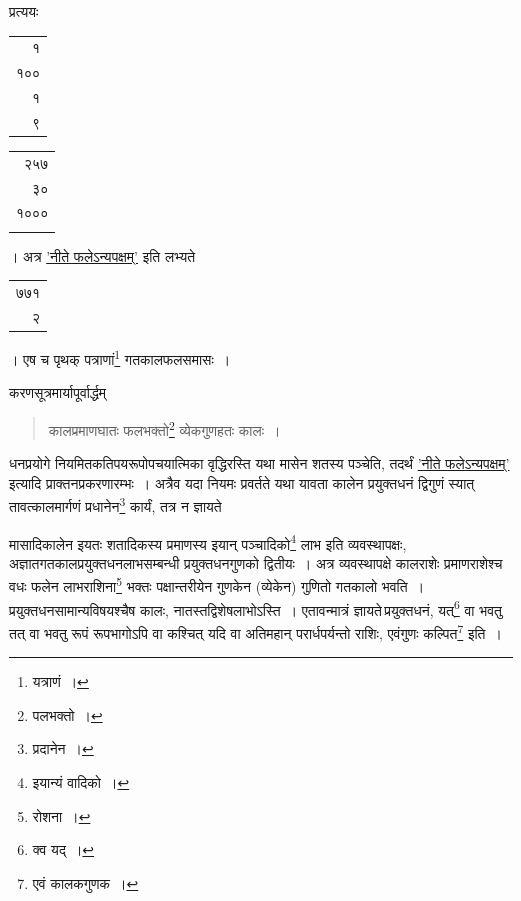 \documentclass[10pt, openany]{book}
\begin{document}
{{{{{प्रत्ययः\textendash \,\begin{tabular}{r|}१ \\१००\\१\\९\end{tabular}\begin{tabular}{r}२५७ \\ ३० \\ १००० \\ \\ \end{tabular}। अत्र \hyperref[45]{'नीते फलेऽन्यपक्षम्'} इति लभ्यते\begin{tabular}{r}७७१ \\ २\end{tabular}। एष च पृथक् पत्राणां\renewcommand{\thefootnote}{\s ५}\footnote{\s यत्राणं~।}  गतकालफलसमासः~।}
\vspace{3mm}

{करणसूत्रमार्यापूर्वार्द्धम्\textemdash}

 \label{52.1}
\begin{quote} {\bs कालप्रमाणघातः फलभक्तो\renewcommand{\thefootnote}{\s ६}\footnote{\s पलभक्तो~।}  व्येकगुणहतः कालः~।}\end{quote}

{धनप्रयोगे नियमितकतिपयरूपोपचयात्मिका वृद्धिरस्ति यथा मासेन शतस्य
पञ्चेति,}
{तदर्थं \hyperref[45]{'नीते फलेऽन्यपक्षम्'} इत्यादि प्राक्तनप्रकरणारम्भः~। अत्रैव यदा
नियमः प्रवर्तते यथा}
{यावता कालेन प्रयुक्तधनं द्विगुणं स्यात् तावत्कालमार्गणं प्रधानेन\renewcommand{\thefootnote}{\s ७}\footnote{\s प्रदानेन~।} 
कार्यं, तत्र न ज्ञायते}

\newpage

{मासादिकालेन इयतः शतादिकस्य प्रमाणस्य इयान् पञ्चादिको\renewcommand{\thefootnote}{\s २}\footnote{\s इयान्यं वादिको~।}  लाभ इति
व्यवस्थापक्षः,}
{अज्ञातगतकालप्रयुक्तधनलाभसम्बन्धी प्रयुक्तधनगुणको द्वितीयः~। अत्र
व्यवस्थापक्षे कालराशेः}
{प्रमाणराशेश्च वधः फलेन लाभराशिना\renewcommand{\thefootnote}{\s ३}\footnote{\s रोशना~।}  भक्तः पक्षान्तरीयेन गुणकेन
(व्येकेन) गुणितो}
{गतकालो भवति~। प्रयुक्तधनसामान्यविषयश्चैष कालः, नातस्तद्विशेषलाभोऽस्ति~।
एतावन्मात्रं}
{ज्ञायते\textendash \,प्रयुक्तधनं, यत्\renewcommand{\thefootnote}{\s ४}\footnote{\s क्व यद्~।}  वा भवतु तत् वा भवतु रूपं रूपभागोऽपि वा
कश्चित् यदि वा}
{अतिमहान् परार्धपर्यन्तो राशिः, एवंगुणः कल्पित\renewcommand{\thefootnote}{\s ५}\footnote{\s एवं कालकगुणक~।}  इति~।} 

}}}}
\end{document}
